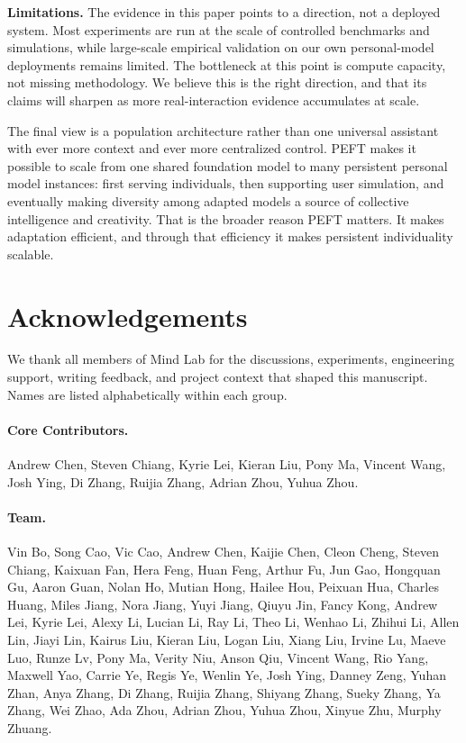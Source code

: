\documentclass{llmxive}
\providecommand{\pony}[1]{#1}
\providecommand{\bmhead}[1]{\section*{#1}}
\begin{document}
\pony{\textbf{Limitations.} The evidence in this paper points to a direction, not a deployed system. Most experiments are run at the scale of controlled benchmarks and simulations, while large-scale empirical validation on our own personal-model deployments remains limited. The bottleneck at this point is compute capacity, not missing methodology. We believe this is the right direction, and that its claims will sharpen as more real-interaction evidence accumulates at scale.}

\pony{The final view is a population architecture rather than one universal assistant with ever more context and ever more centralized control. PEFT makes it possible to scale from one shared foundation model to many persistent personal model instances: first serving individuals, then supporting user simulation, and eventually making diversity among adapted models a source of collective intelligence and creativity. That is the broader reason PEFT matters. It makes adaptation efficient, and through that efficiency it makes persistent individuality scalable.}


\bmhead{Acknowledgements}

We thank all members of Mind Lab for the discussions, experiments, engineering support, writing feedback, and project context that shaped this manuscript. Names are listed alphabetically within each group.

\paragraph{Core Contributors.}
\begin{sloppypar}
Andrew Chen, Steven Chiang, Kyrie Lei, Kieran Liu, Pony Ma, Vincent Wang, Josh Ying, Di Zhang, Ruijia Zhang, Adrian Zhou, Yuhua Zhou.
\end{sloppypar}

\paragraph{Team.}
\begin{sloppypar}
Vin Bo, Song Cao, Vic Cao, Andrew Chen, Kaijie Chen, Cleon Cheng, Steven Chiang, Kaixuan Fan, Hera Feng, Huan Feng, Arthur Fu, Jun Gao, Hongquan Gu, Aaron Guan, Nolan Ho, Mutian Hong, Hailee Hou, Peixuan Hua, Charles Huang, Miles Jiang, Nora Jiang, Yuyi Jiang, Qiuyu Jin, Fancy Kong, Andrew Lei, Kyrie Lei, Alexy Li, Lucian Li, Ray Li, Theo Li, Wenhao Li, Zhihui Li, Allen Lin, Jiayi Lin, Kairus Liu, Kieran Liu, Logan Liu, Xiang Liu, Irvine Lu, Maeve Luo, Runze Lv, Pony Ma, Verity Niu, Anson Qiu, Vincent Wang, Rio Yang, Maxwell Yao, Carrie Ye, Regis Ye, Wenlin Ye, Josh Ying, Danney Zeng, Yuhan Zhan, Anya Zhang, Di Zhang, Ruijia Zhang, Shiyang Zhang, Sueky Zhang, Ya Zhang, Wei Zhao, Ada Zhou, Adrian Zhou, Yuhua Zhou, Xinyue Zhu, Murphy Zhuang.
\end{sloppypar}



\end{document}
